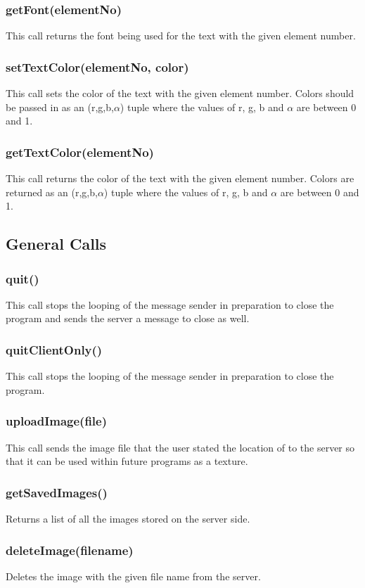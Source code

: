 \documentclass{acm_proc_article-sp}
\begin{document}
\subsubsection{getFont(elementNo)}
This call returns the font being used for the text with the given element number.
\subsubsection{setTextColor(elementNo, color)}
This call sets the color of the text with the given element number. Colors should be passed in as an (r,g,b,$\alpha$) tuple where the values of r, g, b and $\alpha$ are between 0 and 1.
\subsubsection{getTextColor(elementNo)}
This call returns the color of the text with the given element number. Colors are returned as an (r,g,b,$\alpha$) tuple where the values of r, g, b and $\alpha$ are between 0 and 1.
\subsection{General Calls}
\subsubsection{quit()}
This call stops the looping of the message sender in preparation to close the program and sends the server a message to close as well.
\subsubsection{quitClientOnly()}
This call stops the looping of the message sender in preparation to close the program.
\subsubsection{uploadImage(file)}
This call sends the image file that the user stated the location of to the server so that it can be used within future programs as a texture.
\subsubsection{getSavedImages()}
Returns a list of all the images stored on the server side.
\subsubsection{deleteImage(filename)}
Deletes the image with the given file name from the server.
\end{document}
